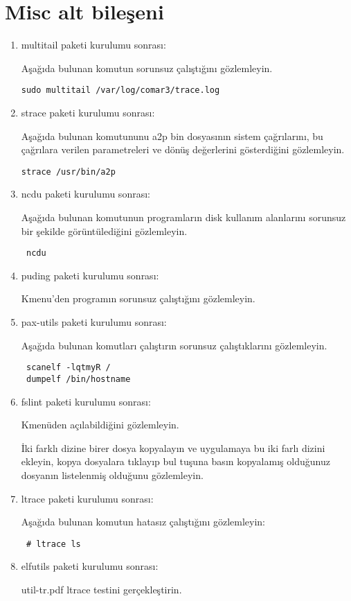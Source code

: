 \documentclass[a4paper,10pt]{article}
\begin{document}
\section{Misc alt bileşeni}
\begin{enumerate}

\item multitail paketi kurulumu sonrası:

Aşağıda bulunan komutun sorunsuz çalıştığını gözlemleyin.
\begin{verbatim}
sudo multitail /var/log/comar3/trace.log 
\end{verbatim}


\item strace paketi kurulumu sonrası: 

Aşağıda bulunan komutununu a2p bin dosyasının sistem çağrılarını, bu çağrılara verilen parametreleri ve dönüş değerlerini gösterdiğini gözlemleyin.
\begin{verbatim}
strace /usr/bin/a2p 
\end{verbatim}



\item ncdu paketi kurulumu sonrası: 

Aşağıda bulunan komutunun programların disk kullanım alanlarını sorunsuz bir şekilde görüntülediğini gözlemleyin.
\begin{verbatim}
 ncdu 
\end{verbatim}


\item puding paketi kurulumu sonrası:

Kmenu'den programın sorunsuz çalıştığını gözlemleyin.

\item pax-utils paketi kurulumu sonrası:

Aşağıda bulunan komutları çalıştırın sorunsuz çalıştıklarını gözlemleyin.
\begin{verbatim}
 scanelf -lqtmyR /
 dumpelf /bin/hostname
\end{verbatim}

 \item fslint paketi kurulumu sonrası:

Kmenüden açılabildiğini gözlemleyin.

İki farklı dizine birer dosya kopyalayın ve uygulamaya bu iki farlı dizini ekleyin, kopya dosyalara tıklayıp bul tuşuna basın kopyalamış olduğunuz dosyanın listelenmiş olduğunu gözlemleyin.
 \item ltrace paketi kurulumu sonrası:

Aşağıda bulunan komutun hatasız çalıştığını gözlemleyin:
\begin{verbatim}
 # ltrace ls
\end{verbatim}
\item elfutils paketi kurulumu sonrası:

util-tr.pdf ltrace testini gerçekleştirin.
\end{enumerate}
\end{document}
